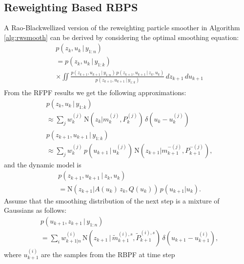 \documentclass[twocolumn]{autart}    %
\begin{document}
\subsection{Reweighting Based RBPS}
%
A Rao-Blackwellized version of the reweighting particle smoother
in Algorithm \ref{alg:rwsmooth} can be derived by considering
the optimal smoothing equation:
%
\begin{equation}
\begin{split}
 &p(z_{k},u_{k} \,|\, y_{1:n}) \\
 &= p(z_{k},u_{k}\,|\,y_{1:k}) \\
 &\times \iint 
    \frac{p(z_{k+1},u_{k+1} \,|\, y_{1:n}) \, p(z_{k+1},u_{k+1}\,|\,z_{k},u_{k})}
         {p(z_{k+1},u_{k+1}\,|\,y_{1:k})} \, dz_{k+1} \, du_{k+1} \\
\end{split}
\end{equation}
%
From the RFPF results we get the following approximations:
%
\begin{equation}
\begin{split}
  &p(z_k,u_{k} \,|\, y_{1:k}) \\
  &\approx \sum_j w_k^{(j)} \, \mathrm{N}(z_{k} | m^{(j)}_{k}, P^{(j)}_{k}) \,
    \delta(u_{k} - u_{k}^{(j)}) \\
  &p(z_{k+1},u_{k+1} \,|\, y_{1:k}) \\
  &\approx \sum_j w_k^{(j)} \, p(u_{k+1}\,|\,u_k^{(j)}) \, \mathrm{N}(z_{k+1} | m^{-(j)}_{k+1}, P^{-(j)}_{k+1}),
\end{split}
\end{equation}
%
and the dynamic model is
%
\begin{equation}
\begin{split}
  &p(z_{k+1},u_{k+1} \,|\, z_{k},u_{k}) \\
  &= \mathrm{N}(z_{k+1} | A(u_k) \, z_k, Q(u_k)) \, p(u_{k+1} | u_k).
\end{split}
\end{equation}
%
Assume that the smoothing distribution of the next step is a mixture
of Gaussians as follows:
%
\begin{equation}
\begin{split}
  &p(u_{k+1},z_{k+1}\,|\,y_{1:n}) \\
  &= 
    \sum_{i} w^{(i)}_{k+1|n} \, \mathrm{N}(z_{k+1}\,|\,\tilde{m}_{k+1}^{(i),s},\tilde{P}_{k+1}^{(i),s}) \,
    \delta(u_{k+1} - u_{k+1}^{(i)}),
\end{split}
\end{equation}
%
where $u_{k+1}^{(i)}$ are the samples from the RBPF at time step
\end{document}
